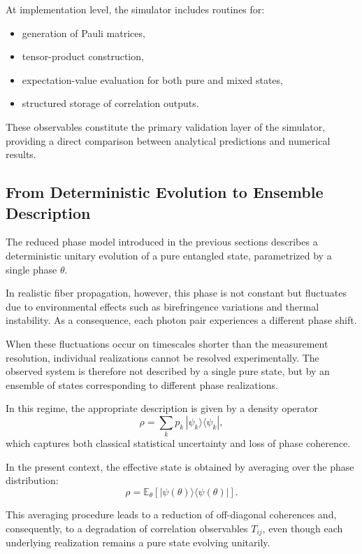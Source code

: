 \documentclass[a4paper]{article}
\begin{document}
At implementation level, the simulator includes routines for:
\begin{itemize}
    \item generation of Pauli matrices,
    \item tensor-product construction,
    \item expectation-value evaluation for both pure and mixed states,
    \item structured storage of correlation outputs.
\end{itemize}

These observables constitute the primary validation layer of the simulator, providing a direct comparison between analytical predictions and numerical results.

\subsection{From Deterministic Evolution to Ensemble Description}

The reduced phase model introduced in the previous sections describes a deterministic unitary evolution of a pure entangled state, parametrized by a single phase \(\theta\).

In realistic fiber propagation, however, this phase is not constant but fluctuates due to environmental effects such as birefringence variations and thermal instability. As a consequence, each photon pair experiences a different phase shift.

When these fluctuations occur on timescales shorter than the measurement resolution, individual realizations cannot be resolved experimentally. The observed system is therefore not described by a single pure state, but by an ensemble of states corresponding to different phase realizations.

\medskip

In this regime, the appropriate description is given by a density operator
\[
\rho = \sum_k p_k \, |\psi_k\rangle\langle \psi_k|,
\]
which captures both classical statistical uncertainty and loss of phase coherence.

\medskip

In the present context, the effective state is obtained by averaging over the phase distribution:
\[
\rho = \mathbb{E}_{\theta}\left[ |\psi(\theta)\rangle\langle \psi(\theta)| \right].
\]

This averaging procedure leads to a reduction of off-diagonal coherences and, consequently, to a degradation of correlation observables \(T_{ij}\), even though each underlying realization remains a pure state evolving unitarily.
\end{document}
